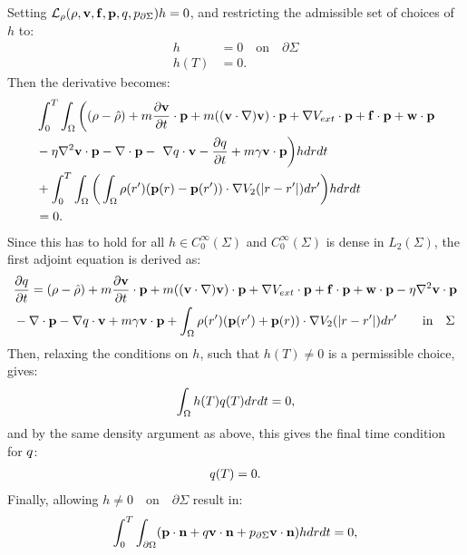 Setting $\mathcal{L}_\rho(\rho,\mathbf{v},\mathbf{f},\mathbf{p},q,{p}_{\partial \Sigma})h=0$, and restricting the admissible set of choices of $h$ to:
\begin{align*}
h&=0 \quad \text{on} \quad \partial \Sigma\\
h(T)&=0.
\end{align*}
Then the derivative becomes:
\begin{align*}
 &\int_0^T \int_\Omega \bigg( (\rho - \hat {\rho}) +m  \frac{\partial \mathbf{v}}{\partial t}\cdot \mathbf{p} + m  ((\mathbf{v} \cdot \nabla)\mathbf{v} )\cdot \mathbf{p}+ \nabla V_{ext}\cdot \mathbf{p} + \mathbf{f} \cdot \mathbf{p} + \mathbf{w} \cdot \mathbf{p} \\
 &- \eta \nabla^2 \mathbf{v} \cdot \mathbf{p}  -\nabla\cdot \mathbf{p}  - \ \nabla q \cdot \mathbf{v}  -  \frac{\partial q}{\partial t} +m \gamma \mathbf{v} \cdot \mathbf{p} \bigg) h dr dt \\
 &+ \int_0^T \int_\Omega \bigg(  \int_\Omega  \rho(r')(\mathbf{p}(r) - \mathbf{p}(r')) \cdot\nabla V_2(|r-r'|)   dr'  \bigg)hdr dt\\
 &=0.
\end{align*}
Since this has to hold for all $h \in C_0^\infty(\Sigma)$ and $C_0^\infty(\Sigma)$ is dense in $L_2(\Sigma)$, the first adjoint equation is derived as:
\begin{align}
& \frac{\partial q}{\partial t} = (\rho - \hat {\rho}) +m  \frac{\partial \mathbf{v}}{\partial t}\cdot \mathbf{p} + m ( (\mathbf{v} \cdot \nabla)\mathbf{v}) \cdot \mathbf{p}+ \nabla V_{ext}\cdot \mathbf{p} + \mathbf{f} \cdot \mathbf{p} + \mathbf{w} \cdot \mathbf{p}  - \eta \nabla^2 \mathbf{v} \cdot \mathbf{p} \\
&-\nabla\cdot \mathbf{p}  -  \nabla q \cdot \mathbf{v} + m \gamma \mathbf{v} \cdot \mathbf{p} + \int_\Omega  \rho(r')(\mathbf{p}(r') + \mathbf{p}(r)) \cdot\nabla V_2(|r-r'|)   dr' \qquad \text{in} \quad \Sigma \notag
\end{align}
Then, relaxing the conditions on $h$, such that $h(T) \neq 0$ is a permissible choice, gives:
\begin{align*}
\int_\Omega h(T) q(T) dr dt=0,
\end{align*}
and by the same density argument as above, this gives the final time condition for $q$:
\begin{align*}
q(T) = {0} .
\end{align*}
Finally, allowing $h \neq 0 \quad \text{on} \quad \partial \Sigma$ result in:
\begin{align*}
\int_0^T \int_{\partial \Omega} ( \mathbf{p} \cdot \mathbf{n}  +  q \mathbf{v} \cdot \mathbf{n}   +{p}_{\partial \Sigma} \mathbf{v} \cdot \mathbf{n})h  dr dt=0,
\end{align*}
